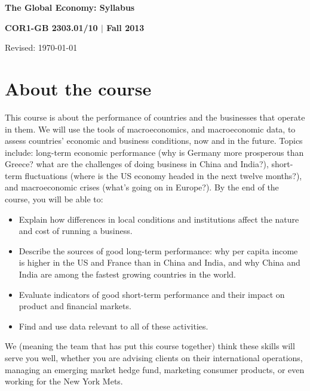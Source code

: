 \documentclass[12pt]{article}
\begin{document}
\thispagestyle{empty}
\bigskipamount
\Head
\centerline{\large\bf The Global Economy:  Syllabus}
\vspace{1mm}
\centerline{\large\bf COR1-GB 2303.01/10 $|$ Fall 2013}
\vspace{1mm}
\centerline{Revised:  \today}

\section{About the course}

This course is about the performance of countries and
the businesses that operate in them.
We will use the tools of macroeconomics, and macroeconomic data,
to assess countries' economic and business conditions, now and in the future.
Topics include:  long-term economic performance (why is Germany more prosperous than Greece? what are the challenges of doing business in China and India?), short-term fluctuations (where is the US economy headed in the next twelve months?), and macroeconomic crises (what's going on in Europe?).
By the end of the course, you will be able to:
%
\begin{itemize}
\item Explain how differences in local conditions
and institutions
affect the nature and cost of running a business.

\item Describe the sources of good long-term performance: why per
capita income is higher in the US and France than in China and India,
and why China and India are among the fastest growing countries in the
world.

\item Evaluate indicators of good short-term performance
and their impact on product and financial markets.


\item Find and use data relevant to all of these activities.

\end{itemize}
%
We (meaning the team that has put this course together)
think these skills will serve you well, whether you are
advising clients on their international operations,
managing an emerging market hedge fund,
marketing consumer products,
or even working for the New York Mets.
\end{document}
